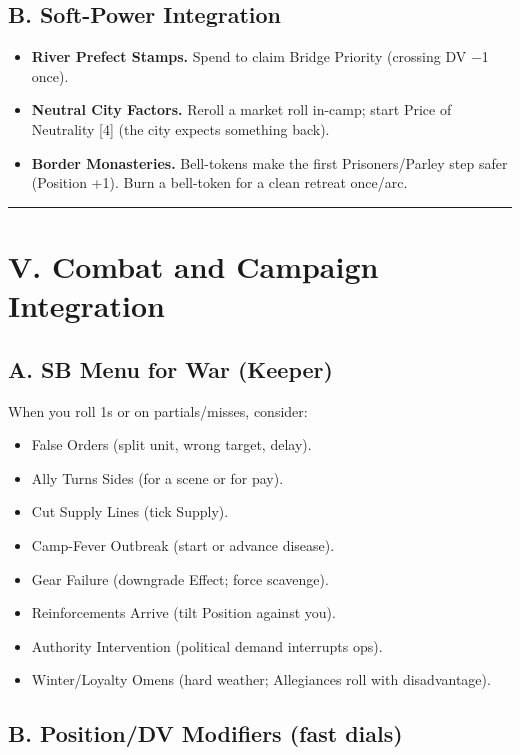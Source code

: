 \documentclass[11pt]{article}
\begin{document}
\subsection*{B. Soft-Power Integration}

\begin{itemize}
    \item \textbf{River Prefect Stamps.} Spend to claim Bridge Priority (crossing DV −1 once).
    \item \textbf{Neutral City Factors.} Reroll a market roll in-camp; start Price of Neutrality [4] (the city expects something back).
    \item \textbf{Border Monasteries.} Bell-tokens make the first Prisoners/Parley step safer (Position +1). Burn a bell-token for a clean retreat once/arc.
\end{itemize}

\rule{\textwidth}{0.4pt}

\section*{V. Combat and Campaign Integration}

\subsection*{A. SB Menu for War (Keeper)}

When you roll 1s or on partials/misses, consider:
\begin{itemize}
    \item False Orders (split unit, wrong target, delay).
    \item Ally Turns Sides (for a scene or for pay).
    \item Cut Supply Lines (tick Supply).
    \item Camp-Fever Outbreak (start or advance disease).
    \item Gear Failure (downgrade Effect; force scavenge).
    \item Reinforcements Arrive (tilt Position against you).
    \item Authority Intervention (political demand interrupts ops).
    \item Winter/Loyalty Omens (hard weather; Allegiances roll with disadvantage).
\end{itemize}

\subsection*{B. Position/DV Modifiers (fast dials)}
\end{document}
